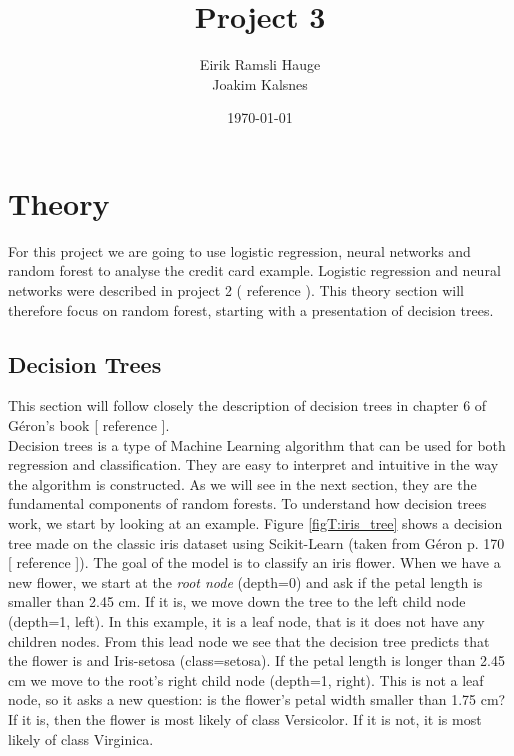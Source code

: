 \documentclass[12pt]{article}
\title{Project 3}
\author{Eirik Ramsli Hauge\\
Joakim Kalsnes
}
\date{\today}
\numberwithin{figure}{section}
\newcommand{\husk}[1]{\color{red} #1 \color{black}}
\begin{document}
\maketitle

\section{Theory}
For this project we are going to use logistic regression, neural networks and random forest to analyse the credit card example. Logistic regression and neural networks were described in project 2 (\husk{reference}). This theory section will therefore focus on random forest, starting with a presentation of decision trees.
\subsection{Decision Trees}
This section will follow closely the description of decision trees in chapter 6 of Géron's book [\husk{reference}].\\
Decision trees is a type of Machine Learning algorithm that can be used for both regression and classification. They are easy to interpret and intuitive in the way the algorithm is constructed. As we will see in the next section, they are the fundamental components of random forests. To understand how decision trees work, we start by looking at an example. Figure \ref{figT:iris_tree} shows a decision tree made on the classic iris dataset using Scikit-Learn (taken from Géron p. 170 [\husk{reference}]). The goal of the model is to classify an iris flower. When we have a new flower, we start at the \textit{root node} (depth=0) and ask if the petal length is smaller than 2.45 cm. If it is, we move down the tree to the left child node (depth=1, left). In this example, it is a leaf node, that is it does not have any children nodes. From this lead node we see that the decision tree predicts that the flower is and Iris-setosa (class=setosa). If the petal length is longer than 2.45 cm we move to the root's right child node (depth=1, right). This is not a leaf node, so it asks a new question: is the flower's petal width smaller than 1.75 cm? If it is, then the flower is most likely of class Versicolor. If it is not, it is most likely of class Virginica.\\ 
\end{document}
